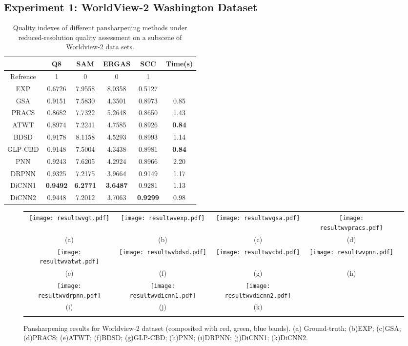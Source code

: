 \documentclass[journal]{IEEEtran}
\begin{document}
\subsection{Experiment 1: WorldView-2 Washington Dataset}
\begin{table}[htp]
\small
\caption{Quality indexes of different pansharpening methods under reduced-resolution quality assessment on a  subscene of Worldview-2 data sets.}
\centering
\begin{tabular}{c|ccccc}
\hline
{}&Q8&SAM& ERGAS &SCC&Time(s)\\
\hline
Refrence&1 &0 &0 &1&{}\\
\hline
EXP&0.6726 &7.9558 &8.0358 &0.5127 &{}\\
\hline
\hline
GSA&0.9151 &7.5830 &4.3501 &0.8973 &0.85\\
\hline
PRACS&0.8682 &7.7322 &5.2648 &0.8650 &1.43\\
\hline
ATWT&0.8974 &7.2241 &4.7585 &0.8926 &\textbf{0.84}\\
\hline
BDSD&0.9178 &8.1158 &4.5293 &0.8993 &1.14\\
\hline
GLP-CBD&0.9148 &7.5004 &4.3438 &0.8981 &\textbf{0.84}\\
\hline
\hline
PNN &0.9243 &7.6205 &4.2924 &0.8966&2.20\\
\hline
DRPNN &0.9325 &7.2175 &3.9664 &0.9149 &1.17\\
\hline
DiCNN1 &\textbf{0.9492} &\textbf{6.2771} &\textbf{3.6487} &0.9281 &1.13\\
\hline
DiCNN2 &0.9448 &7.2012 &3.7063 &\textbf{0.9299}&0.98\\
\hline
\end{tabular}
\label{table:qualitywv}
\end{table}

\begin{figure*}[t]\scriptsize
\centering
  \begin{tabular}{ccccc}
\texttt{[image: resultwvgt.pdf]} &
\texttt{[image: resultwvexp.pdf]} &
\texttt{[image: resultwvgsa.pdf]} &
\texttt{[image: resultwvpracs.pdf]} \\
(a) & (b) & (c) &(d) \\
\texttt{[image: resultwvatwt.pdf]} &
\texttt{[image: resultwvbdsd.pdf]} &
\texttt{[image: resultwvcbd.pdf]} &
\texttt{[image: resultwvpnn.pdf]} \\
(e) & (f) & (g) &(h)  \\
\texttt{[image: resultwvdrpnn.pdf]} &
\texttt{[image: resultwvdicnn1.pdf]} &
\texttt{[image: resultwvdicnn2.pdf]} \\
(i) &(j) & (k)  \\
\\
\end{tabular}
\caption{Pansharpening results for Worldview-2 dataset (composited with red, green, blue bands). (a) Ground-truth; (b)EXP; (c)GSA; (d)PRACS; (e)ATWT; (f)BDSD; (g)GLP-CBD; (h)PNN; (i)DRPNN; (j)DiCNN1; (k)DiCNN2.}
\label{figure:reducewv2}
\end{figure*}
\end{document}
